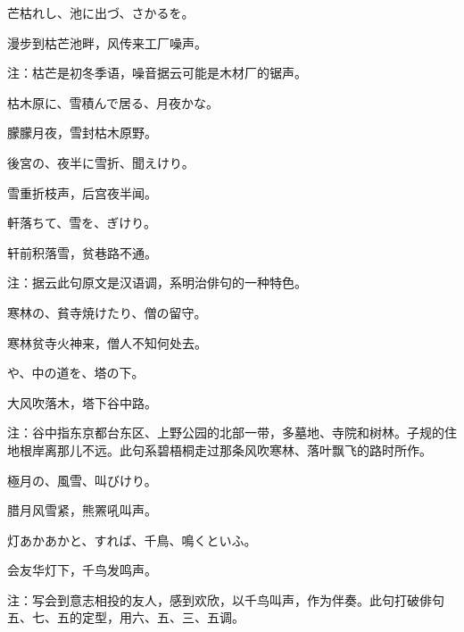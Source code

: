 \begin{haiku}
    {\FH 芒枯れし、池に出づ、さかるを。}

    {\FK 漫步到枯芒池畔，风传来工厂噪声。}

    {\FT 注：枯芒是初冬季语，噪音据云可能是木材厂的锯声。}
\end{haiku}

\begin{haiku}
    {\FH 枯木原に、雪積んで居る、月夜かな。}

    {\FK 朦朦月夜，雪封枯木原野。}
\end{haiku}

\begin{haiku}
    {\FH 後宮の、夜半に雪折、聞えけり。}

    {\FK 雪重折枝声，后宫夜半闻。}
\end{haiku}

\begin{haiku}
    {\FH 軒落ちて、雪を、ぎけり。}

    {\FK 轩前积落雪，贫巷路不通。}

    {\FT 注：据云此句原文是汉语调，系明治俳句的一种特色。}
\end{haiku}

\begin{haiku}
    {\FH 寒林の、貧寺焼けたり、僧の留守。}

    {\FK 寒林贫寺火神来，僧人不知何处去。}
\end{haiku}

\begin{haiku}
    {\FH {}や、中の道を、塔の下。}

    {\FK 大风吹落木，塔下谷中路。}

    {\FT 注：谷中指东京都台东区、上野公园的北部一带，多墓地、寺院和树林。子规的住地根岸离那儿不远。此句系碧梧桐走过那条风吹寒林、落叶飘飞的路时所作。}
\end{haiku}

\begin{haiku}
    {\FH 極月の、風雪、叫びけり。}

    {\FK 腊月风雪紧，熊罴吼叫声。}
\end{haiku}

\begin{haiku}
    {\FH 灯あかあかと、すれば、千鳥、鳴くといふ。}

    {\FK 会友华灯下，千鸟发鸣声。}

    {\FT 注：写会到意志相投的友人，感到欢欣，以千鸟叫声，作为伴奏。此句打破俳句五、七、五的定型，用六、五、三、五调。}
\end{haiku}

